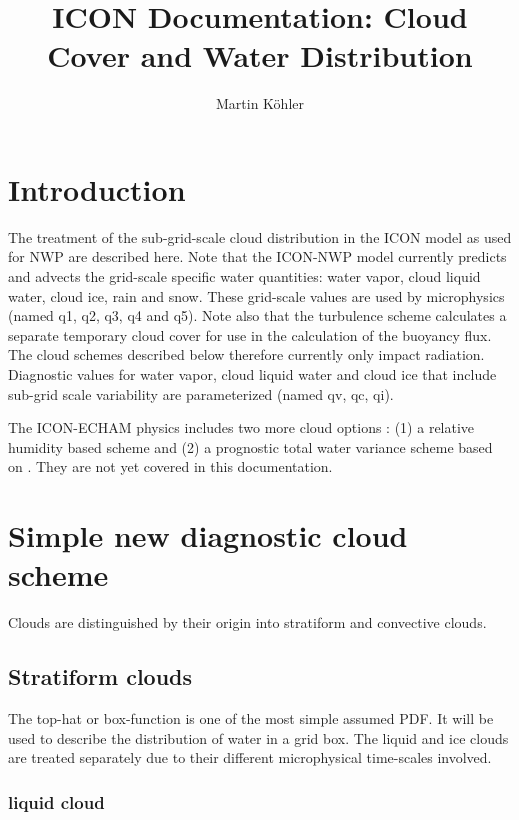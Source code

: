 \documentclass[a4paper,11pt]{article}
\author{Martin K\"{o}hler}
\title{ICON Documentation: Cloud Cover and Water Distribution}
\begin{document}
  \maketitle


\section{Introduction}

The treatment of the sub-grid-scale cloud distribution 
in the ICON model as used for NWP are described here.  Note that the ICON-NWP
model currently predicts and advects the grid-scale specific water quantities: 
water vapor, cloud liquid water, cloud ice, rain and snow.  These grid-scale
values are used by microphysics (named q1, q2, q3, q4 and q5).  
Note also that the turbulence scheme 
calculates a separate temporary cloud
cover for use in the calculation of the buoyancy flux.
The cloud schemes described below therefore currently only impact radiation.
Diagnostic values for water vapor, cloud liquid water and cloud ice that include
sub-grid scale variability are parameterized (named qv, qc, qi).

The ICON-ECHAM physics includes two more cloud options : 
(1) a relative humidity based scheme and (2) a prognostic
total water variance scheme based on \cite{tompkins:2002}. 
They are not yet covered 
in this documentation.



\section{Simple new diagnostic cloud scheme}
\label{sc:diag}

Clouds are distinguished by their origin into stratiform and convective clouds.

\subsection{Stratiform clouds}

The top-hat or box-function is one of the most simple assumed PDF.  It will be 
used to describe the distribution of water in a grid box.  The liquid and ice 
clouds are treated separately due to their different microphysical time-scales 
involved. 

\subsubsection{liquid cloud}
\end{document}
